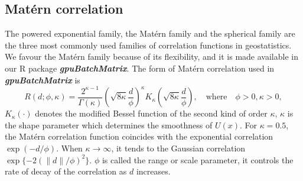 \documentclass{article}\usepackage[]{graphicx}\usepackage[]{color}
\newcommand{\prog}[1]{\textsf{#1}}
\newcommand{\pkg}[1]{\textbf{\emph{#1}}}
\begin{document}
\subsection{Mat\'ern correlation}
The powered exponential family, the Mat\'ern family and the spherical family are the three most commonly used families of correlation functions in geostatistics. We favour the Mat\'ern family because of its flexibility, and it is made available in our \prog{R} package \pkg{gpuBatchMatrix}. The form of Mat\'ern correlation used in \pkg{gpuBatchMatrix} is 
\begin{equation*}
R(d;\phi,\kappa)=\frac{2^{\kappa-1}}{\Gamma(\kappa)} (\sqrt{8\kappa} \frac{d}{\phi})^\kappa  K_\kappa(\sqrt{8\kappa}  \frac{d}{\phi}),  \quad \text{where} \quad \phi>0,  \kappa > 0,
\end{equation*} 
$K_\kappa(\cdot)$ denotes the modified Bessel function of the second kind of order $\kappa$, 
$\kappa$ is the shape parameter which determines the smoothness of $U(x)$. For $\kappa=0.5$, the Mat\'ern correlation function coincides with the exponential correlation $\exp(-d/\phi)$. When $\kappa \rightarrow \infty$, it tends to the Gaussian correlation $\exp{\{-2(\|d\|/\phi)^2\}}$.
$\phi$ is called the range or scale parameter, it controls the rate of decay of the correlation as $d$ increases. 
\end{document}
